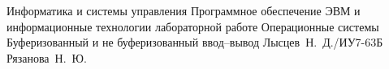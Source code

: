 \documentclass{bmstu}
\begin{document}
	\makereporttitle
	{Информатика и системы управления} %
	{Программное обеспечение ЭВМ и информационные технологии} %
	{лабораторной работе} %
	{Операционные системы} %
	{Буферизованный и не буферизованный ввод--вывод} %
	{} %
	{Лысцев~Н.~Д./ИУ7-63Б} %
	{Рязанова~Н.~Ю.} %
	
	
\end{document}
